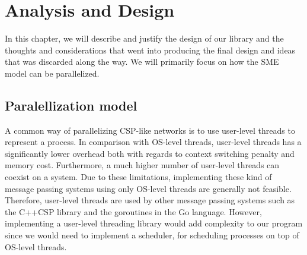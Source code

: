 \chapter{Analysis and Design}
In this chapter, we will describe and justify the design of our
library and the thoughts and considerations that went into producing
the final design and ideas that was discarded along the way. We will
primarily focus on how the SME model can be parallelized.




\section{Paralellization model}
A common way of parallelizing CSP-like networks is to use user-level
threads to represent a process. In comparison with OS-level threads,
user-level threads has a significantly lower overhead both with
regards to context switching penalty \cite{sung2002comparative} and
memory cost. Furthermore, a  much higher number of user-level threads can
coexist on a system. Due to these limitations, implementing these kind of
message passing systems using only OS-level threads are generally not
feasible. Therefore, user-level threads are used by other message
passing systems such as the C++CSP library\cite{brown2003introduction}
and the goroutines in the Go
language\cite{deshpandeanalysis}. However, implementing a user-level
threading library would add complexity to our program since we would
need to implement a scheduler, for scheduling processes on top of
OS-level threads.

